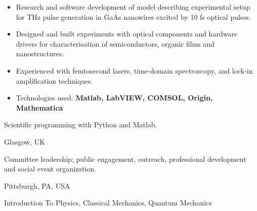 \documentclass[10pt,a4paper,ragged2e,withhyper]{altacv}
\begin{document}
\begin{paracol}{2}
\begin{itemize}
    \item Research and software development of model describing experimental
    setup for THz pulse generation in GaAs nanowires excited by 10 fs
    optical pulses.

    \item Designed and built experiments with optical components and hardware
    drivers for characterisation of semiconductors, organic films and
    nanostructures.
    
    \item Experienced with femtosecond lasers, time-domain spectroscopy, and
    lock-in amplification techniques.

    \item Technologies used:
    {\bf Matlab, LabVIEW, COMSOL, Origin, Mathematica}
\end{itemize}



Scientific programming with Python and Matlab.

\divider

{Glasgow, UK}

Committee leadership;
public engagement, outreach, professional development and social event
organization.


\divider

{Pittsburgh, PA, USA}

Introduction To Physics, Classical Mechanics, Quantum Mechanics




\end{paracol}
\end{document}
